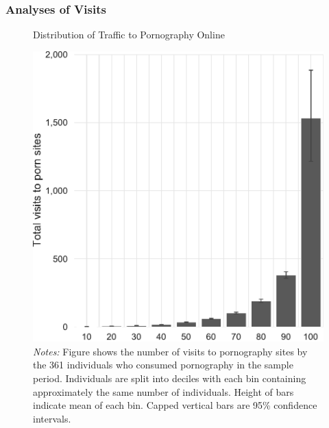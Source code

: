 \documentclass[12pt, letterpaper]{article}
\begin{document}
\subsubsection{Analyses of Visits}
\label{si:visits}
\begin{figure}[ht]
	\centering
	\caption{Distribution of Traffic to Pornography Online}
	\includegraphics[width=.5\linewidth]{../figs/distribution_visits_to_adultsites.pdf}
	\caption*{\footnotesize \emph{Notes:} 
		Figure shows the number of visits to pornography sites by the 361 individuals who consumed pornography in the sample period.
		Individuals are split into deciles with each bin containing approximately the same number of individuals.
		Height of bars indicate mean of each bin.
		Capped vertical bars are 95\% confidence intervals.
	}
	\label{fig:distribution_visits}
\end{figure}
\end{document}
